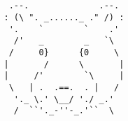 \documentclass{article}
\begin{document}
\vfill
\centering
\small
\begin{BVerbatim}


    .--.              .--.
   : (\ ". _......_ ." /) :
    '.    `        `    .'
     /'   _        _   `\
    /     0}      {0     \
   |       /      \       |
   |     /'        `\     |
    \   | .  .==.  . |   /
     '._ \.' \__/ './ _.'
     /  ``'._-''-_.'``  \


\end{BVerbatim}
\end{document}
